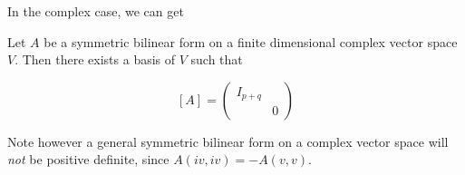 \documentclass{article}
\begin{document}
In the complex case, we can get

\begin{corollary}
    Let \(A\) be a symmetric bilinear form on a finite dimensional complex vector space \(V\). Then there exists a basis of \(V\) such that

    \[[A] = \begin{pmatrix}
        I_{p+q} \\ & 0
    \end{pmatrix}\]
\end{corollary}

Note however a general symmetric bilinear form on a complex vector space will \emph{not} be positive definite, since \(A(iv, iv) = -A(v,v)\).
\end{document}
